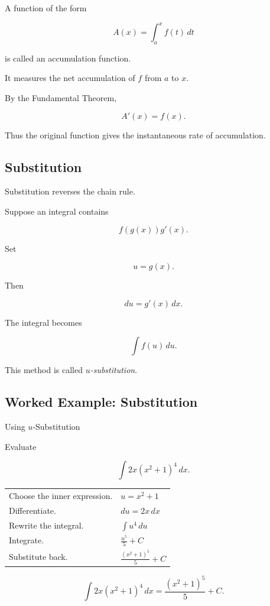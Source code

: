 A function of the form

\[ A(x)=\int_a^x f(t)\,dt \]

is called an accumulation function.

It measures the net accumulation of \(f\) from \(a\) to \(x\).

By the Fundamental Theorem,

\[ A'(x)=f(x). \]

Thus the original function gives the instantaneous rate of accumulation.

\subsection{Substitution}
\label{subsec:substitution}

Substitution reverses the chain rule.

Suppose an integral contains

\[ f(g(x))g'(x). \]

Set

\[ u=g(x). \]

Then

\[ du=g'(x)\,dx. \]

The integral becomes

\[ \int f(u)\,du. \]

This method is called \emph{\(u\)-substitution}.

\subsection{Worked Example: Substitution}
\label{subsec:worked-substitution}

\begin{workedexamplebox}{Using \(u\)-Substitution}

Evaluate

\[ \int 2x(x^2+1)^4\,dx. \]

\begin{tabularx}{\textwidth}{@{}>{\raggedright\arraybackslash}p{}X@{}}
Choose the inner expression. &
\(u=x^2+1\)\\
Differentiate. &
\(du=2x\,dx\)\\
Rewrite the integral. &
\(\displaystyle \int u^4\,du\)\\
Integrate. &
\(\displaystyle \frac{u^5}{5}+C\)\\
Substitute back. &
\(\displaystyle \frac{(x^2+1)^5}{5}+C\)
\end{tabularx}

\begin{answerbox}
\[ \boxed{\int 2x(x^2+1)^4\,dx
=\frac{(x^2+1)^5}{5}+C.} \]
\end{answerbox}
\end{workedexamplebox}

